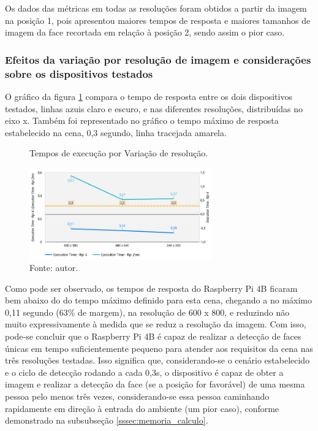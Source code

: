 Os dados das métricas em todas as resoluções foram obtidos a partir da imagem na posição 1, pois apresentou maiores tempos de resposta e maiores tamanhos de imagem da face recortada em relação à posição 2, sendo assim o pior caso.

\subsubsection{Efeitos da variação por resolução de imagem e considerações sobre os dispositivos testados}

O gráfico da figura \ref{fig:cena2_graficos_variacao_resolucao} compara o tempo de resposta entre os dois dispositivos testados, linhas azuis claro e escuro, e nas diferentes resoluções, distribuídas no eixo x. Também foi representado no gráfico o tempo máximo de resposta estabelecido na cena, 0,3 segundo, linha tracejada amarela. 

\begin{figure}[h]
    \centering
    \caption[Tempos de execução por Variação de resolução.]{Tempos de execução por Variação de resolução.}
    \includegraphics[width=0.7\textwidth]{Cap4_Experimentos_Realizados/Figures/cena2_graficos_variacao_resolucao.jpg}
    \caption*{Fonte: autor.}
    \label{fig:cena2_graficos_variacao_resolucao}
\end{figure}

Como pode ser observado, os tempos de resposta do Raspberry Pi 4B ficaram bem abaixo do do tempo máximo definido para esta cena, chegando a no máximo 0,11 segundo (63\% de margem), na resolução de 600 x 800, e reduzindo não muito expressivamente à medida que se reduz a resolução da imagem. Com isso, pode-se concluir que o Raspberry Pi 4B é capaz de realizar a detecção de faces únicas em tempo suficientemente pequeno para atender aos requisitos da cena nas três resoluções testadas. Isso significa que, considerando-se o cenário estabelecido e o ciclo de detecção rodando a cada 0,3s, o dispositivo é capaz de obter a imagem e realizar a detecção da face (se a posição for favorável) de uma mesma pessoa pelo menos três vezes, considerando-se essa pessoa caminhando rapidamente em direção à entrada do ambiente (um pior caso), conforme demonstrado na subsubseção \ref{sssec:memoria_calculo}.

